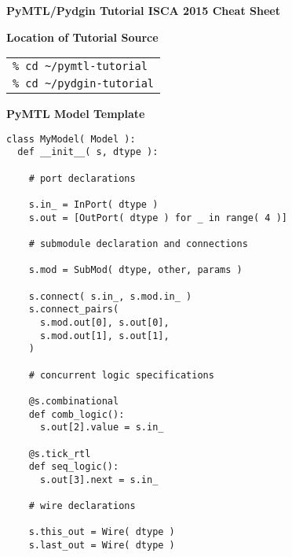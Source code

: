 \documentclass{cbxdoc}
\begin{document}
\pagestyle{empty}

\begin{landscape}
\small

\begin{center}
  \textbf{\Large PyMTL/Pydgin
    Tutorial  \hspace{0.5em}\textbullet\hspace{0.5em}
    ISCA 2015 \hspace{0.5em}\textbullet\hspace{0.5em}
    Cheat Sheet}
\end{center}

\begin{minipage}[t]{3.25in}
\vspace{0pt}

\colorbox{gray!30!white}{\parbox{1.025\tw}{\rule[-0.4em]{0pt}{1.4em}\centering\textbf{%
  Location of Tutorial Source%
}}}

\smallskip\smallskip
\begin{tabular}{p{\tw}}
\verb|% cd ~/pymtl-tutorial| \\
\verb|% cd ~/pydgin-tutorial| \\
\end{tabular}

\vspace{0.25in}
\colorbox{gray!30!white}{\parbox{1.025\tw}{\rule[-0.4em]{0pt}{1.4em}\centering\textbf{%
  PyMTL Model Template%
}}}

\smallskip
\begin{lstlisting}
class MyModel( Model ):
  def __init__( s, dtype ):

    # port declarations

    s.in_ = InPort( dtype )
    s.out = [OutPort( dtype ) for _ in range( 4 )]

    # submodule declaration and connections

    s.mod = SubMod( dtype, other, params )

    s.connect( s.in_, s.mod.in_ )
    s.connect_pairs(
      s.mod.out[0], s.out[0],
      s.mod.out[1], s.out[1],
    )

    # concurrent logic specifications

    @s.combinational
    def comb_logic():
      s.out[2].value = s.in_

    @s.tick_rtl
    def seq_logic():
      s.out[3].next = s.in_

    # wire declarations

    s.this_out = Wire( dtype )
    s.last_out = Wire( dtype )


\end{lstlisting}
\end{minipage}
\end{landscape}
\end{document}
